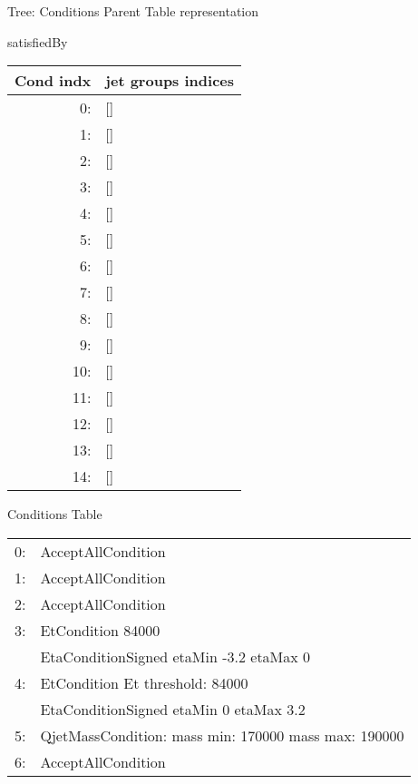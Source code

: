 \documentclass{beamer}
\begin{document}
\begin{frame}[fragile=singleslide]
\begin{minipage}[t]{0.48\linewidth}
\begin{block}{Tree: Conditions Parent Table representation}
\begin{center}
\begin{tiny}
\end{tiny}
\end{center}
\end{block}
\end{minipage}
\begin{minipage}[t]{0.38\linewidth}
\begin{block}{satisfiedBy}
\begin{center}
\begin{tiny}
\begin{tabular}{r|l}
Cond indx& jet groups indices\\ \hline
0: & [] \\
1: & [] \\
2: & [] \\
3: & [] \\
4: & [] \\
5: & [] \\
6: & [] \\
7: & [] \\
8: & [] \\
9: & [] \\
10:& [] \\
11:& [] \\
12:& [] \\
13:& [] \\
14:& [] \\
\end{tabular}
\end{tiny}
\end{center}
\end{block}
\end{minipage}\hfill
\begin{minipage}[t]{0.58\linewidth}
\begin{block}{Conditions Table}
\begin{tiny}
\begin{tabular}{ll}
  0: & AcceptAllCondition\\
  1: & AcceptAllCondition\\
  2: & AcceptAllCondition\\
  3: & EtCondition 84000 \\
     & EtaConditionSigned etaMin -3.2 etaMax 0 \\
  4: & EtCondition Et threshold: 84000 \\
     & EtaConditionSigned etaMin 0 etaMax 3.2 \\
  5: & QjetMassCondition: mass min: 170000 mass max: 190000 \\
  6: & AcceptAllCondition\\

\end{tabular}
\end{tiny}
\end{block}
\end{minipage}
\end{frame}
\end{document}
